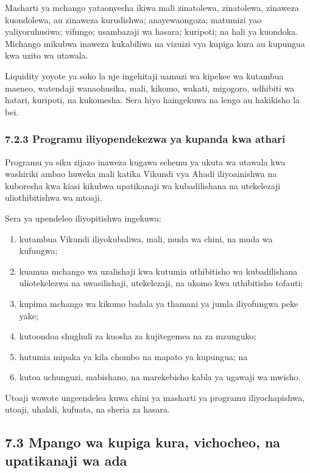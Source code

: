 \documentclass[11pt]{article}
\begin{document}
Masharti ya mchango yataonyesha ikiwa mali zinatolewa, zinatolewa, zinaweza kuondolewa, au zinaweza kurudishwa; anayewaongoza; matumizi yao yaliyoruhusiwa; vifungo; usambazaji wa hasara; kuripoti; na hali ya kuondoka. Michango mikubwa inaweza kukabiliwa na vizuizi vya kupiga kura au kupungua kwa uzito wa utawala.

Liquidity yoyote ya soko la nje ingehitaji uamuzi wa kipekee wa kutambua maeneo, watendaji wanaohusika, mali, kikomo, wakati, migogoro, udhibiti wa hatari, kuripoti, na kukomesha. Sera hiyo haingekuwa na lengo au hakikisho la bei.

\subsubsection*{7.2.3 Programu iliyopendekezwa ya kupanda kwa athari}

Programu ya siku zijazo inaweza kugawa sehemu ya ukuta wa utawala kwa washiriki ambao huweka mali katika Vikundi vya Ahadi iliyoainishwa na kuboresha kwa kiasi kikubwa upatikanaji wa kubadilishana na utekelezaji uliothibitishwa wa mtoaji.

Sera ya upendeleo iliyopitishwa ingekuwa:

\begin{enumerate}[leftmargin=*]
\item kutambua Vikundi iliyokubaliwa, mali, muda wa chini, na muda wa kufungwa;
\item kuamua mchango wa uzalishaji kwa kutumia uthibitisho wa kubadilishana uliotekelezwa na uwasilishaji, utekelezaji, na ukomo kwa uthibitisho tofauti;
\item kupima mchango wa kikomo badala ya thamani ya jumla iliyofungwa peke yake;
\item kutoondoa shughuli za kuosha za kujitegemea na za mzunguko;
\item hutumia mipaka ya kila chombo na mapato ya kupungua; na
\item kutoa uchunguzi, mabishano, na marekebisho kabla ya ugawaji wa mwisho.
\end{enumerate}
Utoaji wowote ungeendelea kuwa chini ya masharti ya programu iliyochapishwa, utoaji, uhalali, kufuata, na sheria za hasara.

\subsection*{7.3 Mpango wa kupiga kura, vichocheo, na upatikanaji wa ada}
\end{document}
